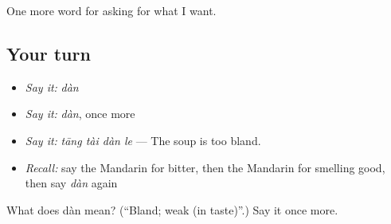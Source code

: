 \begin{grammarlens}[title={What you've built}]
One more word for asking for what I want.
\end{grammarlens}

\subsection*{Your turn}
\begin{itemize}
\raggedright
  \item \emph{Say it:} \emph{dàn}
  \item \emph{Say it:} \emph{dàn}, once more
  \item \emph{Say it:} \emph{tāng tài dàn le} — The soup is too bland.
  \item \emph{Recall:} say the Mandarin for bitter, then the Mandarin for smelling good, then say \emph{dàn} again
\end{itemize}

\begin{tcolorbox}[breakable,colback=teal!4,colframe=teal!35!black,title={Before you move on}]
What does dàn mean? (\textquotedblleft{}Bland; weak (in taste)\textquotedblright{}.) Say it once more.
\end{tcolorbox}
